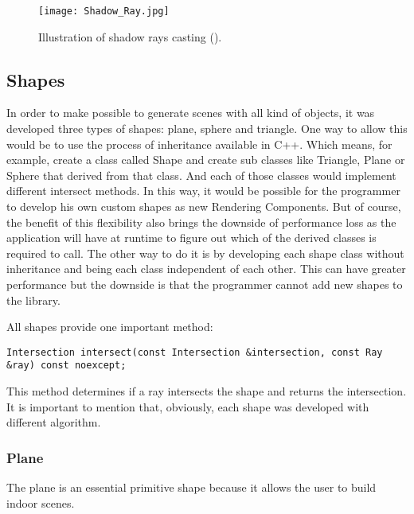 \begin{figure}[H]
	\centering
	\caption{Illustration of shadow rays casting (\cite{ShadowRays}).}
	\label{Illustration of shadow rays casting.}
	\texttt{[image: Shadow\_Ray.jpg]}
\end{figure}


\subsection{Shapes}

\par
In order to make possible to generate scenes with all kind of objects, it was developed three types of shapes: plane, sphere and triangle.
One way to allow this would be to use the process of inheritance available in C++.
Which means, for example, create a class called Shape and create sub classes like Triangle, Plane or Sphere that derived from that class.
And each of those classes would implement different intersect methods.
In this way, it would be possible for the programmer to develop his own custom shapes as new Rendering Components.
But of course, the benefit of this flexibility also brings the downside of performance loss as the application will have at runtime to figure out which of the derived classes is required to call.
The other way to do it is by developing each shape class without inheritance and being each class independent of each other.
This can have greater performance but the downside is that the programmer cannot add new shapes to the library.

All shapes provide one important method:

\begin{lstlisting}[caption={Main methods in Shape}, captionpos=b, label=Shape]
Intersection intersect(const Intersection &intersection, const Ray &ray) const noexcept;
\end{lstlisting}

This method determines if a ray intersects the shape and returns the intersection.
It is important to mention that, obviously, each shape was developed with different algorithm.

\subsubsection{Plane}

\par
The plane is an essential primitive shape because it allows the user to build indoor scenes.

